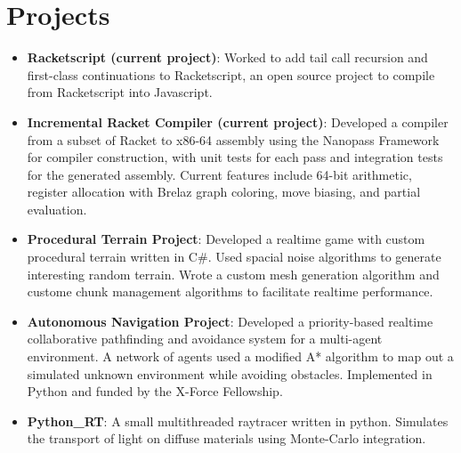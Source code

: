 \documentclass[letterpaper,11pt]{article}
\newcommand{\resumeItem}[2]{
  \item\small{
    \textbf{#1}{: #2 \vspace{-2pt}}
  }
}
\newcommand{\resumeSubItem}[2]{\resumeItem{#1}{#2}\vspace{-4pt}}
\newcommand{\resumeSubHeadingListStart}{\begin{itemize}[leftmargin=*]}
\newcommand{\resumeSubHeadingListEnd}{\end{itemize}}
\begin{document}
\section{Projects}
  \resumeSubHeadingListStart
    \resumeSubItem{Racketscript (current project)}
      {Worked to add tail call recursion and first-class continuations to Racketscript, an open source project to compile from Racketscript into Javascript.}
    \resumeSubItem{Incremental Racket Compiler (current project)}
      {Developed a compiler from a subset of Racket to x86-64 assembly using the Nanopass Framework for compiler construction, with unit tests for each pass and integration tests for the generated assembly. Current features include 64-bit arithmetic, register allocation with Brelaz graph coloring, move biasing, and partial evaluation.}
    \resumeSubItem{Procedural Terrain Project}
      {Developed a realtime game with custom procedural terrain written in C\#. Used spacial noise algorithms to generate interesting random terrain. Wrote a custom mesh generation algorithm and custome chunk management algorithms to facilitate realtime performance.}
    \resumeSubItem{Autonomous Navigation Project}
      {Developed a priority-based realtime collaborative pathfinding and avoidance system for a multi-agent environment. A network of agents used a modified A* algorithm to map out a simulated unknown environment while avoiding obstacles. Implemented in Python and funded by the X-Force Fellowship.}
    \resumeSubItem{Python\_RT}
      {A small multithreaded raytracer written in python. Simulates the transport of light on diffuse materials using Monte-Carlo integration.}
  \resumeSubHeadingListEnd
\end{document}
